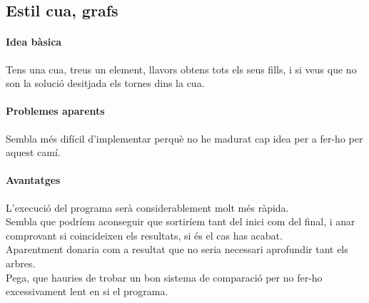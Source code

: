\documentclass[a4paper,10pt]{article}
\begin{document}
\subsection{Estil cua, grafs}
\paragraph{Idea bàsica}
Tens una cua, treus un element, llavors obtens tots els seus fills, i si veus que no son la solució desitjada els tornes dins la cua.
\paragraph{Problemes aparents}
Sembla més difícil d'implementar perquè no he madurat cap idea per a fer-ho per aquest camí.
\paragraph{Avantatges}
L'execució del programa serà considerablement molt més ràpida.\\

Sembla que podríem aconseguir que sortiríem tant del inici com del final, i anar comprovant si coincideixen els resultats, si és el cas has
acabat.\\
Aparentment donaria com a resultat que no seria necessari aprofundir tant els arbres.\\
Pega, que hauries de trobar un bon sistema de comparació per no fer-ho excessivament lent en si el programa.
\end{document}
